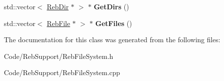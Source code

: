 \begin{DoxyCompactItemize}
\item 
std\+::vector$<$ \hyperlink{class_reb_dir}{Reb\+Dir} $\ast$ $>$ $\ast$ {\bfseries Get\+Dirs} ()\hypertarget{class_reb_dir_a77594fb772172918a412990a3e556bca}{}\label{class_reb_dir_a77594fb772172918a412990a3e556bca}

\item 
std\+::vector$<$ \hyperlink{class_reb_file}{Reb\+File} $\ast$ $>$ $\ast$ {\bfseries Get\+Files} ()\hypertarget{class_reb_dir_a123b46a26d2500e362edaa38d6b2c652}{}\label{class_reb_dir_a123b46a26d2500e362edaa38d6b2c652}

\end{DoxyCompactItemize}


The documentation for this class was generated from the following files\+:\begin{DoxyCompactItemize}
\item 
Code/\+Reb\+Support/Reb\+File\+System.\+h\item 
Code/\+Reb\+Support/Reb\+File\+System.\+cpp\end{DoxyCompactItemize}
